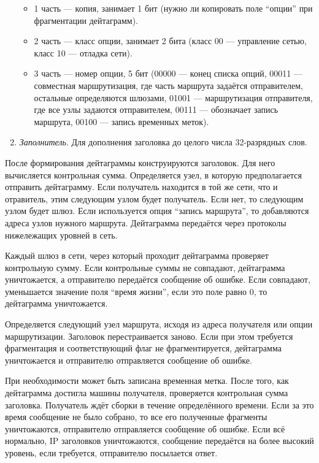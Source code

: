 \documentclass[12pt, russian, oneside, article]{ncc}
\begin{document}
\begin{enumerate}
\begin{itemize}
\item 1 часть --- копия, занимает 1 бит (нужно ли копировать поле ``опции'' при фрагментации дейтаграмм).
\item 2 часть --- класс опции, занимает 2 бита (класс 00 --- управление сетью, класс 10 --- отладка сети).
\item 3 часть --- номер опции, 5 бит (00000 --- конец списка опций, 00011 --- совместная маршрутизация, где часть маршрута задаётся отправителем, остальные определяются шлюзами, 01001 --- маршрутизация отправителя, где все узлы задаются отправителем, 00111 --- обозначает запись маршрута, 00100 --- запись временных меток).
\end{itemize}

\item \emph{Заполнитель}. Для дополнения заголовка до целого числа 32-разрядных слов.
\end{enumerate}

После формирования дейтаграммы конструируются заголовок. Для него вычисляется контрольная сумма. Определяется узел, в которую предполагается отправить дейтаграмму. Если получатель находится в той же сети, что и отравитель, этим следующим узлом будет получатель. Если нет, то следующим узлом будет шлюз. Если используется опция ``запись маршрута'', то добавляются адреса узлов нужного маршрута. Дейтаграмма передаётся через протоколы нижележащих уровней в сеть.

Каждый шлюз в сети, через который проходит дейтаграмма проверяет контрольную сумму. Если контрольные суммы не совпадают, дейтаграмма уничтожается, а отправителю передаётся сообщение об ошибке. Если совпадают, уменьшается значение поля ``время жизни'', если это поле равно 0, то дейтаграмма уничтожается.

Определяется следующий узел маршрута, исходя из адреса получателя или опции маршрутизации. Заголовок перестраивается заново. Если при этом требуется фрагментация и соответствующий флаг не фрагментируется, дейтаграмма уничтожается и отправителю отправляется сообщение об ошибке.

При необходимости может быть записана временная метка. После того, как дейтаграмма достигла машины получателя, проверяется контрольная сумма заголовка. Получатель ждёт сборки в течение определённого времени. Если за это время сообщение не было собрано, то все его полученные фрагменты уничтожаются, отправителю отправляется сообщение об ошибке. Если всё нормально, IP заголовков уничтожаются, сообщение передаётся на более высокий уровень, если требуется, отправителю посылается ответ.
\end{document}
